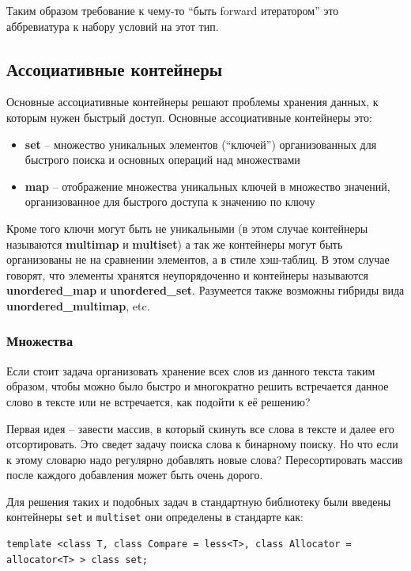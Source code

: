 \documentclass[a4paper,12pt,oneside]{article}
\begin{document}
Таким образом требование к чему-то ``быть forward итератором'' это аббревиатура к набору условий на этот тип.

\pagebreak
\subsection{Ассоциативные контейнеры}\label{AssociativeContainers}

Основные ассоциативные контейнеры решают проблемы хранения данных, к которым нужен быстрый доступ. Основные ассоциативные контейнеры это:

\begin{itemize}
\item \textbf{set} -- множество уникальных элементов (``ключей'') организованных для быстрого поиска и основных операций над множествами
\item \textbf{map} -- отображение множества уникальных ключей в множество значений, организованное для быстрого доступа к значению по ключу
\end{itemize}

Кроме того ключи могут быть не уникальными (в этом случае контейнеры называются \textbf{multimap} и \textbf{multiset}) а так же контейнеры могут быть организованы не на сравнении элементов, а в стиле хэш-таблиц. В этом случае говорят, что элементы хранятся неупорядоченно и контейнеры называются \textbf{unordered\_map} и \textbf{unordered\_set}. Разумеется также возможны гибриды вида \textbf{unordered\_multimap}, etc.

\subsubsection{Множества}

Если стоит задача организовать хранение всех слов из данного текста таким образом, чтобы можно было быстро и многократно решить встречается данное слово в тексте или не встречается, как подойти к её решению?

Первая идея -- завести массив, в который скинуть все слова в тексте и далее его отсортировать. Это сведет задачу поиска слова к бинарному поиску. Но что если к этому словарю надо регулярно добавлять новые слова? Пересортировать массив после каждого добавления может быть очень дорого.

Для решения таких и подобных задач в стандартную библиотеку были введены контейнеры \lstinline!set! и \lstinline!multiset! они определены в стандарте как:

\begin{lstlisting}
template <class T, class Compare = less<T>, class Allocator = allocator<T> > class set;
\end{lstlisting}
\end{document}
